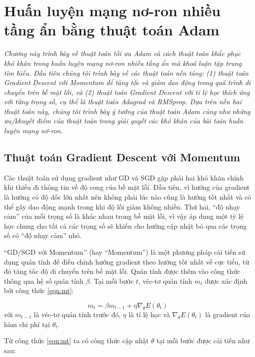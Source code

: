 \chapter{Huấn luyện mạng nơ-ron nhiều tầng ẩn bằng thuật toán Adam}
\label{Chapter3}

\textit{Chương này trình bày về thuật toán tối ưu Adam và cách thuật toán khắc phục khó khăn trong huấn luyện mạng nơ-ron nhiều tầng ẩn mà khoá luận tập trung tìm hiểu. Đầu tiên chúng tôi trình bày về các thuật toán nền tảng: (1) thuật toán Gradient Descent với Momentum để tăng tốc và giảm dao động trong quá trình di chuyển trên bề mặt lỗi, và (2) thuật toán Gradient Descent với tỉ lệ học thích ứng với từng trọng số, cụ thể là thuật toán Adagrad và RMSprop. Dựa trên nền hai thuật toán này, chúng tôi trình bày ý tưởng của thuật toán Adam cũng như những ưu/khuyết điểm của thuật toán trong giải quyết các khó khăn của bài toán huấn luyện mạng nơ-ron.}

\section{Thuật toán Gradient Descent với Momentum}

Các thuật toán sử dụng gradient như GD và SGD gặp phải hai khó khăn chính khi thiếu đi thông tin về độ cong của bề mặt lỗi. Đầu tiên, vì hướng của gradient là hướng có độ dốc lớn nhất nên không phải lúc nào cũng là hướng tốt nhất và có thể gây dao động mạnh trong khi độ lỗi giảm không nhiều. Thứ hai, ``độ nhạy cảm'' của mỗi trọng số là khác nhau trong bề mặt lỗi, vì vậy áp dụng một tỷ lệ học chung cho tất cả các trọng số sẽ khiến cho hướng cập nhật bỏ qua các trọng số có ``độ nhạy cảm'' nhỏ.

``GD/SGD với Momentum'' (hay ``Momentum'') là một phương pháp cải tiến sử dụng quán tính để điều chỉnh hướng gradient theo hướng tốt nhất về cực tiểu, từ đó tăng tốc độ di chuyển trên bề mặt lỗi. Quán tính được thêm vào công thức thông qua hệ số quán tính $\beta$. Tại mỗi bước $t$, véc-tơ quán tính $m_t$ được xác định bởi công thức \ref{eqn:mt}:

\begin{equation}
	\label{eqn:mt}
	m_t = \beta m_{t-1} + \eta\nabla_\theta E(\theta_t)
\end{equation}
với $m_{t-1}$ là véc-tơ quán tính trước đó, $\eta$ là tỉ lệ học và $\nabla_\theta E(\theta_t)$ là gradient của hàm chi phí tại $\theta_t$.

Từ công thức \ref{eqn:mt} ta có công thức cập nhật $\theta$ tại mỗi bước được cải tiến như sau:

